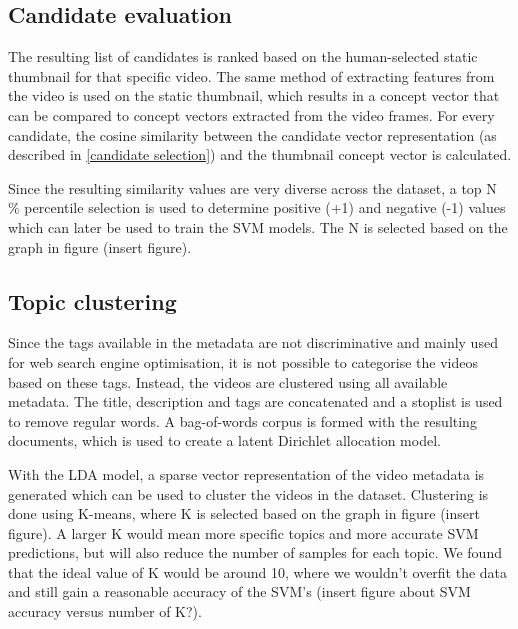 \documentclass{../resources/acm_proc_article-sp}
\begin{document}
\subsection{Candidate evaluation}
\label{candidate evaluation}


The resulting list of candidates is ranked based on the human-selected static thumbnail for that specific video. The same method of extracting features from the video is used on the static thumbnail, which results in a concept vector that can be compared to concept vectors extracted from the video frames. For every candidate, the cosine similarity between the candidate vector representation (as described in \ref{candidate selection}) and the thumbnail concept vector is calculated. 

Since the resulting similarity values are very diverse across the dataset, a top N \% percentile selection is used to determine positive (+1) and negative (-1) values which can later be used to train the SVM models. The N is selected based on the graph in figure (insert figure).

\subsection{Topic clustering}




Since the tags available in the metadata are not discriminative and mainly used for web search engine optimisation, it is not possible to categorise the videos based on these tags. Instead, the videos are clustered using all available metadata. The title, description and tags are concatenated and a stoplist is used to remove regular words. A bag-of-words corpus is formed with the resulting documents, which is used to create a latent Dirichlet allocation model.

With the LDA model, a sparse vector representation of the video metadata is generated which can be used to cluster the videos in the dataset. Clustering is done using K-means, where K is selected based on the graph in figure (insert figure). A larger K would mean more specific topics and more accurate SVM predictions, but will also reduce the number of samples for each topic. We found that the ideal value of K would be around 10, where we wouldn't overfit the data and still gain a reasonable accuracy of the SVM's (insert figure about SVM accuracy versus number of K?).
\end{document}

